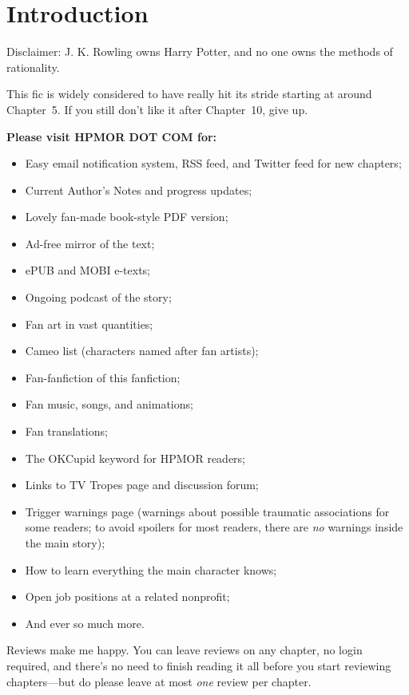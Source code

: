 \chapter{Introduction}
Disclaimer: J. K. Rowling owns Harry Potter, and no one owns the methods of
rationality.

This fic is widely considered to have really hit its stride starting at around
Chapter~5. If you still don't like it after Chapter~10, give up.

\SmallVSpace
\textbf{Please visit HPMOR DOT COM for:}

\SmallVSpace
\begin{itemize}
    \item Easy email notification system, RSS feed, and Twitter feed for new chapters;
    \item Current Author's Notes and progress updates;
    \item Lovely fan-made book-style PDF version;
    \item Ad-free mirror of the text;
    \item ePUB and MOBI e-texts;
    \item Ongoing podcast of the story;
    \item Fan art in vast quantities;
    \item Cameo list (characters named after fan artists);
    \item Fan-fanfiction of this fanfiction;
    \item Fan music, songs, and animations;
    \item Fan translations;
    \item The OKCupid keyword for HPMOR readers;
    \item Links to TV Tropes page and discussion forum;
    \item Trigger warnings page (warnings about possible traumatic associations
        for some readers; to avoid spoilers for most readers, there are
        \emph{no} warnings inside the main story);
    \item How to learn everything the main character knows;
    \item Open job positions at a related nonprofit;
    \item And ever so much more.
\end{itemize}

\SmallVSpace
Reviews make me happy. You can leave reviews on any chapter, no login required,
and there's no need to finish reading it all before you start reviewing
chapters---but do please leave at most \emph{one} review per chapter.

